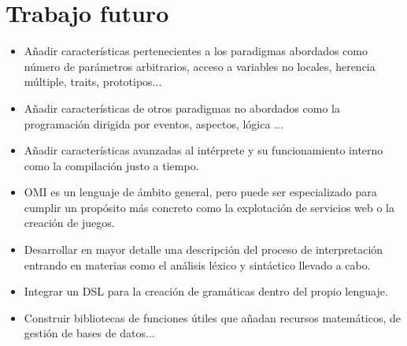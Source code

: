 \section{Trabajo futuro}
\begin{itemize}
\item Añadir características pertenecientes a los paradigmas abordados como número de parámetros arbitrarios, acceso a variables no locales, herencia múltiple, traits, prototipos...
\item Añadir características de otros paradigmas no abordados como la programación dirigida por eventos, aspectos, lógica ...
\item Añadir características avanzadas al intérprete y su funcionamiento interno como la compilación justo a tiempo.
\item OMI es un lenguaje de ámbito general, pero puede ser especializado para cumplir un propósito más concreto como la explotación de servicios web o la creación de juegos. 
\item Desarrollar en mayor detalle una descripción del proceso de interpretación entrando en materias como el análisis léxico y sintáctico llevado a cabo. 
\item Integrar un DSL para la creación de gramáticas dentro del propio lenguaje.
\item Construir bibliotecas de funciones útiles que añadan recursos matemáticos, de gestión de bases de datos...
\end{itemize}

 
